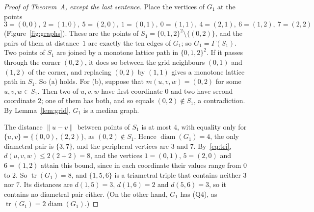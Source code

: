 \documentclass[11pt]{article}
\theoremstyle{remark}
\DeclareMathOperator{\diam}{diam}
\DeclareMathOperator{\tr}{tr}
\newcommand{\QB}{\textup{(Q4)}}
\begin{document}
\begin{proof}[Proof of Theorem~A, except the last sentence]
Place the vertices of $G_1$ at the points
\[
 3=(0,0),\ 2=(1,0),\ 5=(2,0),\ 1=(0,1),\ 0=(1,1),\ 4=(2,1),\ 6=(1,2),\ 7=(2,2)
\]
(Figure~\ref{fig:graphs}). These are the points of
$S_1=\{0,1,2\}^2\setminus\{(0,2)\}$, and the pairs of them at distance~$1$ are
exactly the ten edges of $G_1$; so $G_1=\Gamma(S_1)$. Two points of $S_1$ are
joined by a monotone lattice path in $\{0,1,2\}^2$. If it passes through the
corner $(0,2)$, it does so between the grid neighbours $(0,1)$ and $(1,2)$ of
the corner, and replacing $(0,2)$ by $(1,1)$ gives a monotone lattice path in
$S_1$. So (a) holds. For (b), suppose that $m(u,v,w)=(0,2)$ for some
$u,v,w\in S_1$. Then two of $u,v,w$ have first coordinate $0$ and two have
second coordinate $2$; one of them has both, and so equals $(0,2)\notin S_1$, a
contradiction. By Lemma~\ref{lem:grid}, $G_1$ is a median graph.

The distance $\|u-v\|$ between points of $S_1$ is at most $4$, with equality
only for $\{u,v\}=\{(0,0),(2,2)\}$, as $(0,2)\notin S_1$. Hence
$\diam(G_1)=4$, the only diametral pair is $\{3,7\}$, and the peripheral
vertices are $3$ and $7$. By~\eqref{eq:tri}, $d(u,v,w)\le2(2+2)=8$, and the
vertices $1=(0,1)$, $5=(2,0)$ and $6=(1,2)$ attain this bound, since in each
coordinate their values range from $0$ to $2$. So $\tr(G_1)=8$, and
$\{1,5,6\}$ is a triametral triple that contains neither $3$ nor $7$. Its
distances are $d(1,5)=3$, $d(1,6)=2$ and $d(5,6)=3$, so it contains no
diametral pair either. (On the other hand, $G_1$ has \QB, as
$\tr(G_1)=2\diam(G_1)$.)
\end{proof}
\end{document}
